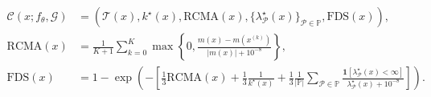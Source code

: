 
\begin{align}
\mathcal{C}(x;f_\theta,\mathcal{G})
&=
\left(
\mathcal{T}(x),
k^\star(x),
\mathrm{RCMA}(x),
\{\lambda^\star_{\mathcal{P}}(x)\}_{\mathcal{P}\in\mathbb{P}},
\mathrm{FDS}(x)
\right),\\
\mathrm{RCMA}(x)
&=
\frac{1}{K+1}\sum_{k=0}^{K}
\max\!\left\{0,
\frac{m(x)-m(x^{(k)})}{|m(x)|+10^{-8}}
\right\},\\
\mathrm{FDS}(x)
&=
1-\exp\!\left(-\left[
\tfrac{1}{3}\mathrm{RCMA}(x)+
\tfrac{1}{3}\frac{1}{k^\star(x)}+
\tfrac{1}{3}\frac{1}{|\mathbb{P}|}\sum_{\mathcal{P}\in\mathbb{P}}
\frac{\mathbf{1}[\lambda^\star_\mathcal{P}(x)<\infty]}{\lambda^\star_\mathcal{P}(x)+10^{-8}}
\right]\right).
\end{align}
